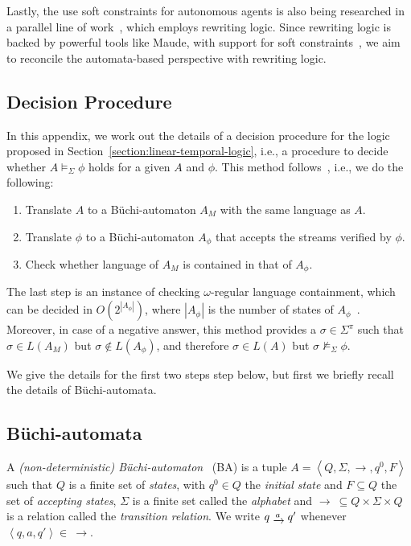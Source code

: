 \documentclass[a4paper]{article}
\newcommand{\buchi}{B\"{u}chi}
\newcommand{\angl}[1]{\left\langle#1\right\rangle}
\newcommand{\myrightarrow}[1]{\mathrel{\raisebox{-3pt}{$\xrightarrow{#1}$}}}
\theoremstyle{definition}
\begin{document}
Lastly, the use soft constraints for autonomous agents is also being researched in a parallel line of work~\cite{talcott-arbab-yadav-2015}, which employs rewriting logic. Since rewriting logic is backed by powerful tools like Maude, with support for soft constraints~\cite{wirsing-etal-2007}, we aim to reconcile the automata-based perspective with rewriting logic.

\iftechreport%

\begin{appendix}

\section{Decision Procedure}%
\label{appendix:decision-procedure}

In this appendix, we work out the details of a decision procedure for the logic proposed in Section~\ref{section:linear-temporal-logic}, i.e., a procedure to decide whether $A \models_\Sigma \phi$ holds for a given $A$ and $\phi$. This method follows~\cite{vardi-1995}, i.e., we do the following:
\begin{enumerate}
    \item Translate $A$ to a \buchi-automaton $A_M$ with the same language as $A$. 
    \item Translate $\phi$ to a \buchi-automaton $A_\phi$ that accepts the streams verified by $\phi$.
    \item Check whether language of $A_M$ is contained in that of $A_\phi$.
\end{enumerate}

The last step is an instance of checking $\omega$-regular language containment, which can be decided in $O(2^{|A_\phi|})$, where $|A_\phi|$ is the number of states of $A_\phi$~\cite{vardi-1995}. Moreover, in case of a negative answer, this method provides a $\sigma \in \Sigma^\pi$ such that $\sigma \in L(A_M)$ but $\sigma \not\in L(A_\phi)$, and therefore $\sigma \in L(A)$ but $\sigma \not\models_\Sigma \phi$.

We give the details for the first two steps step below, but first we briefly recall the details of \buchi-automata.

\subsection{\buchi-automata}

A \emph{(non-deterministic) \buchi-automaton}~\cite{buchi-1962} (BA) is a tuple $A = \angl{Q, \Sigma, \rightarrow, q^0, F}$ such that $Q$ is a finite set of \emph{states}, with $q^0 \in Q$ the \emph{initial state} and $F \subseteq Q$ the set of \emph{accepting states}, $\Sigma$ is a finite set called the \emph{alphabet} and $\rightarrow\ \subseteq Q \times \Sigma \times Q$ is a relation called the \emph{transition relation}. We write $q \myrightarrow{a} q'$ whenever $\angl{q, a, q'} \in\ \rightarrow$. 


\end{appendix}
\end{document}
